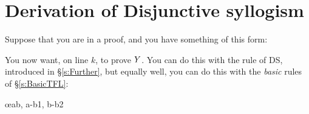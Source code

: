 %


\section{Derivation of Disjunctive syllogism}
Suppose that you are in a proof, and you have something of this form:
\begin{pf}
\end{pf}
You now want, on line $k$, to prove $Y$. You can do this with the rule of DS, introduced in \S\ref{s:Further}, but equally well, you can do this with the \emph{basic} rules of \S\ref{s:BasicTFL}:
	\begin{pf}
		\open
		\close
		\open
		\close
	\oe{ab, a-b1, b-b2}
\end{pf}

